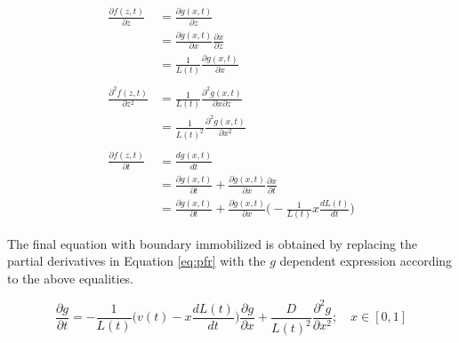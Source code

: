 \documentclass{article}
\begin{document}
\begin{equation}
    \label{eq:pfr}
    \begin{split}
        \frac{\partial f(z, t)}{\partial z}     & = \frac{\partial g(x, t)}{\partial z}                                                                                     \\
                                                & = \frac{\partial g(x, t)}{\partial x} \frac{\partial x}{\partial z}                                                       \\
                                                & = \frac{1}{L(t)}\frac{\partial g(x, t)}{\partial x}                                                                       \\ & \\
        \frac{\partial^2 f(z, t)}{\partial z^2} & = \frac{1}{L(t)}\frac{\partial^2 g(x, t)}{\partial x \partial z}                                                          \\
                                                & = \frac{1}{L(t)^2}\frac{\partial^2 g(x, t)}{\partial x^2}                                                                 \\ &\\
        \frac{\partial f(z, t)}{\partial t}     & = \frac{dg(x, t)}{dt}                                                                                                     \\
                                                & = \frac{\partial g(x, t)}{ \partial t} + \frac{\partial g(x, t)}{\partial x}\frac{\partial x}{\partial t}                 \\
                                                & = \frac{\partial g(x, t)}{ \partial t} + \frac{\partial g(x, t)}{\partial x} \bigg(-\frac{1}{L(t)}x\frac{dL(t)}{dt}\bigg)
    \end{split}
\end{equation}

The final equation with boundary immobilized is obtained by replacing the partial derivatives in Equation \ref{eq:pfr} with the $g$ dependent expression according to the above equalities.

\begin{equation}
    \frac{\partial g}{\partial t} = - \frac{1}{L(t)}\bigg(v(t) - x\frac{dL(t)}{dt}\bigg)\frac{\partial g}{\partial x} + \frac{D}{L(t)^2}\frac{\partial^2 g}{\partial x^2}; \quad x \in [0, 1]
\end{equation}

\newpage{}


\end{document}
